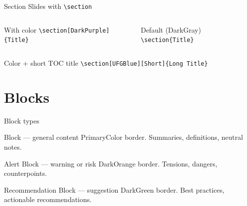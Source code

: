\documentclass[aspectratio=169,t,xcolor=table]{beamer}
\begin{document}
\begin{frame}{Section Slides with \texttt{\textbackslash section}}

    \begin{columns}
        \begin{block}{With color}
            \texttt{\textbackslash section[DarkPurple]\{Title\}}
        \end{block}
        \begin{block}{Default (DarkGray)}
            \texttt{\textbackslash section\{Title\}}
        \end{block}
    \end{columns}
    \vspace{0.5em}
    \begin{block}{Color + short TOC title}
        \texttt{\textbackslash section[UFGBlue][Short]\{Long Title\}}
    \end{block}

\end{frame}

\section[DarkOrange]{Blocks}

\begin{frame}{Block types}

    \begin{block}{Block — general content}
        PrimaryColor border. Summaries, definitions, neutral notes.
    \end{block}

    \vspace{0.5em}

    \begin{alertblock}{Alert Block — warning or risk}
        DarkOrange border. Tensions, dangers, counterpoints.
    \end{alertblock}

    \vspace{0.5em}

    \begin{recommendationblock}{Recommendation Block — suggestion}
        DarkGreen border. Best practices, actionable recommendations.
    \end{recommendationblock}

\end{frame}
\end{document}
